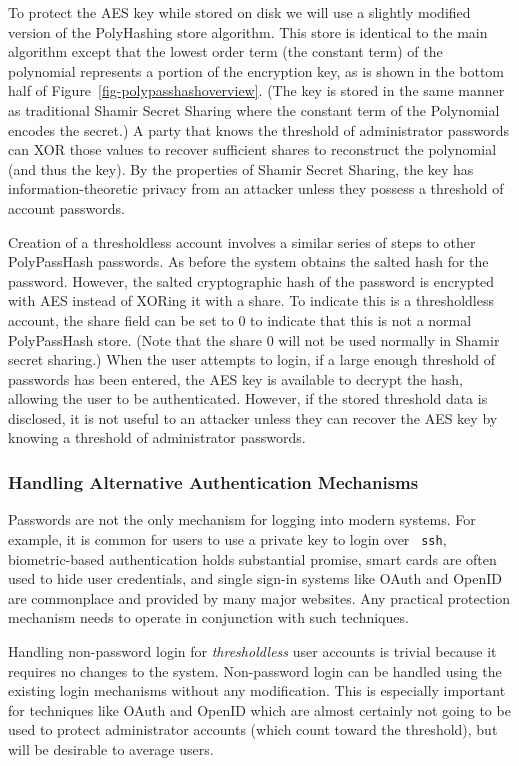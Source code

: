 To protect the AES key while stored on disk we will use a slightly modified
version of the PolyHashing store algorithm.   This store is identical to 
the main algorithm except
that the lowest order term (the constant term) of the polynomial represents 
a portion of the encryption key, as is shown in the bottom half of 
Figure~\ref{fig-polypasshashoverview}.   (The key is stored in the same manner
as traditional Shamir Secret Sharing
where the constant term of the Polynomial encodes the secret.)
A party that knows the threshold of administrator passwords can XOR those
values to recover sufficient shares to reconstruct the polynomial (and thus
the key).  
By the properties of Shamir Secret Sharing, the key has information-theoretic 
privacy from an attacker unless they possess a threshold of account passwords.



Creation of a thresholdless account involves a similar series of steps to
other PolyPassHash passwords.   As before the system obtains the 
salted hash for the password.   However, the salted cryptographic hash of 
the password is encrypted with AES instead of XORing it with a share.
To indicate this is a thresholdless account, the share field can 
be set to 0 to indicate that this is not a normal PolyPassHash 
store.   (Note that the share 0 will not be used normally in Shamir secret
sharing.)   When the user attempts to login, if a large enough 
threshold of passwords has been entered, the AES key is available to decrypt 
the hash, allowing the user to  be authenticated.   However,
if the stored threshold data is disclosed, it is not useful to an attacker
unless they can recover the AES key by knowing a threshold of
administrator passwords.


\subsubsection{Handling Alternative Authentication Mechanisms}

Passwords are not the only mechanism for logging into modern systems.   For
example, it is common for users to use a private key to login over {\tt
ssh}, biometric-based authentication holds substantial promise, 
smart cards are often used to hide user credentials, and single
sign-in systems like OAuth and OpenID are commonplace and provided by 
many major websites.   Any practical protection mechanism needs to operate
in conjunction with such techniques.

Handling non-password login for \emph{thresholdless} user accounts is trivial 
because
it requires no changes to the system.   Non-password login can be handled 
using the existing login mechanisms without any modification.
This is especially important for techniques like OAuth and OpenID which 
are almost certainly not going to be used to protect administrator accounts
(which count toward the threshold), but will be desirable to average users.

